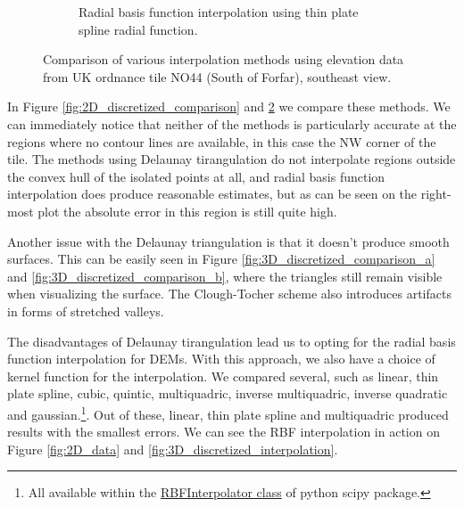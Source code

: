 \documentclass[a4paper,10pt]{report}
\begin{document}
\begin{figure}[H]
\begin{subfigure}{.32\textwidth}
    \caption{Radial basis function interpolation using thin plate spline radial function.}
    \label{fig:3D_discretized_comparison_c}
    \end{subfigure}
    \caption{Comparison of various interpolation methods using elevation data from UK ordnance tile NO44 (South of Forfar), southeast view.}
    \label{fig:3D_discretized_comparison}
\end{figure}

In Figure \ref{fig:2D_discretized_comparison} and \ref{fig:3D_discretized_comparison} we compare these methods. We can immediately notice that neither of the methods is particularly accurate at the regions where no contour lines are available, in this case the NW corner of the tile. The methods using Delaunay tirangulation do not interpolate regions outside the convex hull of the isolated points at all, and radial basis function interpolation does produce reasonable estimates, but as can be seen on the right-most plot the absolute error in this region is still quite high.

Another issue with the Delaunay triangulation is that it doesn't produce smooth surfaces. This can be easily seen in Figure \ref{fig:3D_discretized_comparison_a} and \ref{fig:3D_discretized_comparison_b}, where the triangles still remain visible when visualizing the surface. The Clough-Tocher scheme also introduces artifacts in forms of stretched valleys.

The disadvantages of Delaunay tirangulation lead us to opting for the radial basis function interpolation for DEMs. With this approach, we also have a choice of kernel function for the interpolation. We compared several, such as linear, thin plate spline, cubic, quintic, multiquadric, inverse multiquadric, inverse quadratic and gaussian.\footnote{All available within the \href{https://docs.scipy.org/doc/scipy/reference/generated/scipy.interpolate.RBFInterpolator.html}{RBFInterpolator class} of python scipy package.}. Out of these, linear, thin plate spline and multiquadric produced results with the smallest errors. We can see the RBF interpolation in action on Figure \ref{fig:2D_data} and \ref{fig:3D_discretized_interpolation}.
\end{document}
